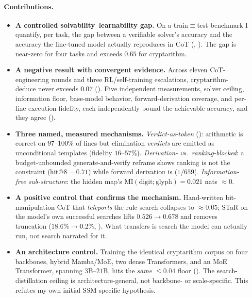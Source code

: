 \documentclass[11pt]{article}
\begin{document}
\paragraph{Contributions.}
\begin{itemize}[leftmargin=1.4em,itemsep=2pt,topsep=2pt]
\item \textbf{A controlled solvability--learnability gap.} On a train$\equiv$test
  benchmark I quantify, per task, the gap between a verifiable solver's accuracy and the
  accuracy the fine-tuned model actually reproduces in CoT (,
  ). The gap is near-zero for four tasks and exceeds $0.65$ for
  cryptarithm.
\item \textbf{A negative result with convergent evidence.} Across eleven CoT-engineering
  rounds and three RL/self-training escalations, cryptarithm-deduce never exceeds $0.07$
  (). Five independent measurements, solver ceiling, information floor,
  base-model behavior, forward-derivation coverage, and per-line execution fidelity, each
  independently bound the achievable accuracy, and they agree ().
\item \textbf{Three named, measured mechanisms.} \emph{Verdict-as-token}
  (): arithmetic is correct on $97$--$100\%$ of lines but elimination
  \emph{verdicts} are emitted as unconditional templates (fidelity $16$--$57\%$).
  \emph{Derivation- vs.\ ranking-blocked}: a budget-unbounded generate-and-verify reframe
  shows ranking is not the constraint ($\mathrm{hit@}8=0.71$) while forward derivation is
  ($1/659$). \emph{Information-free sub-structure}: the hidden map's
  $\mathrm{MI}(\text{digit};\text{glyph})=0.021$ nats $\approx 0$.
\item \textbf{A positive control that confirms the mechanism.} Hand-written bit-manipulation
  CoT that \emph{teleports} the rule search collapses to $\approx\!0.05$; STaR on the
  model's own successful searches lifts $0.526\!\to\!0.678$ and removes truncation
  ($18.6\%\!\to\!0.2\%$, ). What transfers is search the model can
  actually run, not search narrated for it.
\item \textbf{An architecture control.} Training the identical cryptarithm corpus on four
  backbones, hybrid Mamba/MoE, two dense Transformers, and an MoE Transformer, spanning
  $3$B--$21$B, hits the \emph{same} $\leq\!0.04$ floor (). The
  search-distillation ceiling is architecture-general, not backbone- or scale-specific. This
  refutes my own initial SSM-specific hypothesis.

\end{itemize}
\end{document}
